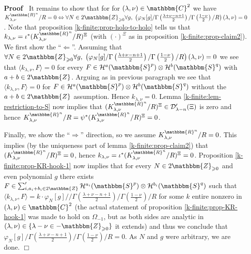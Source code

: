 \documentclass{article}
\newenvironment{proof}{\noindent\textbf{Proof\ }}{\hspace*{\fill}$\Box$\medskip}
\numberwithin{definition}{section}
\numberwithin{lemma}{section}
\numberwithin{proposition}{section}
{\theorembodyfont{\rmfamily}\newtheorem{remark}{Remark}
\numberwithin{remark}{section}
}
\begin{document}
\begin{proof}
  It remains to show that for for $( \lambda, \nu) \in \mathbbm{C}^2$ we have
  $K_{\lambda, \nu}^{\mathbbm{R}^n} / R = 0 \Leftrightarrow \forall N \in
  2\mathbbm{Z}_{\geqslant 0} \forall g, \; \left( \varphi_N [ g] / \Gamma
  \left( \frac{\lambda + \nu - n + 1}{2} \right) / \Gamma \left( \frac{1 -
  \nu}{2} \right) / R \right) ( \lambda, \nu) = 0$. Note that proposition
  \ref{k-finite:prop-holo-to-holo} tells us that $k_{\lambda, \nu} =
  \iota^{\ast} ( K_{\lambda, \nu}^{\mathbbm{R}^n} / R)^{\Xi}$ (with $(
  \cdot)^{\Xi}$ as in proposition \ref{k-finite:prop-claim2}). We first show
  the ``$\Leftarrow$''. Assuming that $\forall N \in 2\mathbbm{Z}_{\geqslant
  0} \forall g, \; \left( \varphi_N [ g] / \Gamma \left( \frac{\lambda + \nu -
  n + 1}{2} \right) / \Gamma \left( \frac{1 - \nu}{2} \right) / R \right) (
  \lambda, \nu) = 0$ we see that $\langle k_{\lambda, \nu}, F \rangle = 0$ for
  every $F \in \mathcal{H}^a ( \mathbbm{S}^p) \otimes \mathcal{H}^b (
  \mathbbm{S}^q)$ with $a + b \in 2\mathbbm{Z}$. Arguing as in previous
  paragraph we see that $\langle k_{\lambda, \nu}, F \rangle = 0$ for $F \in
  \mathcal{H}^a ( \mathbbm{S}^p) \otimes \mathcal{H}^b ( \mathbbm{S}^q)$
  without the $a + b \in 2\mathbbm{Z}$ assumption. Hence $k_{\lambda, \nu} =
  0$. Lemma \ref{k-finite:lem-restriction-to-S} now implies that $(
  K_{\lambda, \nu}^{\mathbbm{R}^n} / R)^{\Xi} \in \mathcal{D}'_{\lambda - n} (
  \Xi)$ is zero and hence $K_{\lambda, \nu}^{\mathbbm{R}^n} / R = \psi^{\ast}
  ( K_{\lambda, \nu}^{\mathbbm{R}^n} / R)^{\Xi} = 0$.
  
  Finally, we show the ``$\Rightarrow$'' direction, so we assume $K_{\lambda,
  \nu}^{\mathbbm{R}^n} / R = 0$. This implies (by the uniqueness part of lemma
  \ref{k-finite:prop-claim2}) that $( K_{\lambda, \nu}^{\mathbbm{R}^n} /
  R)^{\Xi} = 0$, hence $k_{\lambda, \nu} = \iota^{\ast} ( K_{\lambda,
  \nu}^{\mathbbm{R}^n} / R)^{\Xi} = 0$. Proposition
  \ref{k-finite:prop-KR-hook-1} now implies that for every $N \in
  2\mathbbm{Z}_{\geqslant 0}$ and even polynomial $g$ there exists $F \in
  \sum_{i, a_i + b_i \in 2\mathbbm{Z}}' \mathcal{H}^{a_i} ( \mathbbm{S}^p)
  \otimes \mathcal{H}^{b_i} ( \mathbbm{S}^q)$ such that $\langle k_{\lambda,
  \nu}^{}, F \rangle = k \cdot \varphi_N [ g] / / \Gamma \left( \frac{\lambda
  + \nu - n + 1}{2} \right) / \Gamma \left( \frac{1 - \nu}{2} \right) / R$ for
  some $k$ entire nonzero in $( \lambda, \nu) \in \mathbbm{C}^2$ (the actual
  statement of proposition \ref{k-finite:prop-KR-hook-1} was made to hold on
  $\Omega_{- 1}$, but as both sides are analytic in $( \lambda, \nu) \in \{
  \lambda - \nu \in -\mathbbm{Z}_{\geqslant 0} \}$ it extends) and thus we
  conclude that $\varphi_N [ g] / \Gamma \left( \frac{\lambda + \nu - n +
  1}{2} \right) / \Gamma \left( \frac{1 - \nu}{2} \right) / R = 0$. As $N$ and
  $g$ were arbitrary, we are done.
\end{proof}
\end{document}
